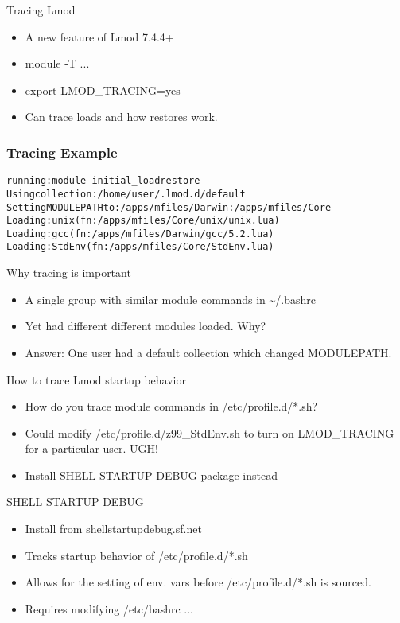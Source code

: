 \documentclass[dvipsnames,aspectratio=169]{beamer}
\begin{document}
\begin{frame}{Tracing Lmod}
  \begin{itemize}
    \item A new feature of Lmod 7.4.4+
    \item module -T ...
    \item export LMOD\_TRACING=yes
    \item Can trace loads and how restores work.
  \end{itemize}
\end{frame}

\begin{frame}[fragile]
    \frametitle{Tracing Example}
  {\small
    \begin{alltt}
running: module --initial\_load restore
  Using collection:      /home/user/.lmod.d/default
  Setting MODULEPATH to: /apps/mfiles/Darwin:/apps/mfiles/Core
  Loading: unix (fn: /apps/mfiles/Core/unix/unix.lua)
  Loading: gcc (fn: /apps/mfiles/Darwin/gcc/5.2.lua)
  Loading: StdEnv (fn: /apps/mfiles/Core/StdEnv.lua)
    \end{alltt}
}
\end{frame}


\begin{frame}{Why tracing is important}
  \begin{itemize}
    \item A single group with similar module commands in \textasciitilde/.bashrc
    \item Yet had different different modules loaded. Why?
    \item Answer: One user had a default collection which changed MODULEPATH.
  \end{itemize}
\end{frame}

\begin{frame}{How to trace Lmod startup behavior}
  \begin{itemize}
    \item How do you trace module commands in /etc/profile.d/*.sh?
    \item Could modify /etc/profile.d/z99\_StdEnv.sh to turn on
      LMOD\_TRACING for a particular user. UGH!
    \item Install SHELL STARTUP DEBUG package instead
  \end{itemize}
\end{frame}

\begin{frame}{SHELL STARTUP DEBUG}
  \begin{itemize}
    \item Install from shellstartupdebug.sf.net
    \item Tracks startup behavior of /etc/profile.d/*.sh
    \item Allows for the setting of env. vars before
      /etc/profile.d/*.sh is sourced.
    \item Requires modifying /etc/bashrc ...
  \end{itemize}
\end{frame}
\end{document}

